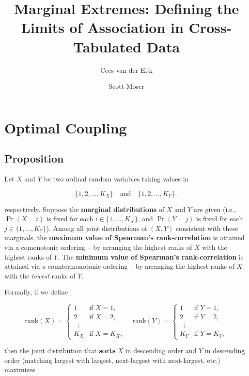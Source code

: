 \documentclass[
  12pt,
  letterpaper,
  DIV=11,
  numbers=noendperiod]{scrartcl}
\title{Marginal Extremes: Defining the Limits of Association in
Cross-Tabulated Data}
\author{Cees van der Eijk \and Scott Moser}
\date{}
\begin{document}
\maketitle

\section{Optimal Coupling}\label{optimal-coupling}

\subsection{\texorpdfstring{\textbf{Proposition}}{Proposition}}\label{proposition}

Let \(X\) and \(Y\) be two ordinal random variables taking values in

\[\{1, 2, \ldots, K_X\} \quad \text{and} \quad \{1, 2, \ldots, K_Y\},\]

respectively. Suppose the \textbf{marginal distributions} of \(X\) and
\(Y\) are given (i.e., \(\Pr(X = i)\) is fixed for each
\(i\in \{1,\dots,K_X\}\), and \(\Pr(Y = j)\) is fixed for each
\(j\in \{1,\dots,K_Y\}\)). Among all joint distributions of \((X, Y)\)
consistent with these marginals, the \textbf{maximum value of Spearman's
rank-correlation} is attained via a comonotonic ordering -- by arranging
the highest ranks of \(X\) with the highest ranks of \(Y\). The
\textbf{minimum value of Spearman's rank-correlation} is attained via a
countermonotonic ordering -- by arranging the highest ranks of \(X\)
with the \emph{lowest} ranks of \(Y\).

Formally, if we define

\[\mathrm{rank}(X) = \begin{cases}  
1 & \text{if } X=1,\\  
2 & \text{if } X=2,\\  
\;\;\vdots\\  
K_X & \text{if } X=K_X,  
\end{cases}  
\quad  
\mathrm{rank}(Y) = \begin{cases}  
1 & \text{if } Y=1,\\  
2 & \text{if } Y=2,\\  
\;\;\vdots\\  
K_Y & \text{if } Y=K_Y,  
\end{cases}\]

then the joint distribution that \textbf{sorts} \(X\) in descending
order and \(Y\) in descending order (matching largest with largest,
next-largest with next-largest, etc.) maximizes
\end{document}
